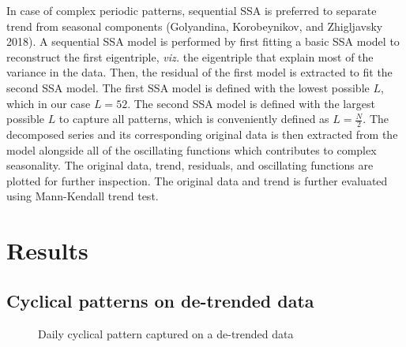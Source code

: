 \documentclass[
  letterpaper,
  DIV=11,
  numbers=noendperiod]{scrartcl}
\newcommand*\uselandscape{%
  \cleardoublepage
  \KOMAoptions{paper=landscape}%
  \recalctypearea
  \areaset{1.2\textwidth}{1.2\textheight}%
}
\begin{document}
In case of complex periodic patterns, sequential SSA is preferred to
separate trend from seasonal components (Golyandina, Korobeynikov, and
Zhigljavsky 2018). A sequential SSA model is performed by first fitting
a basic SSA model to reconstruct the first eigentriple, \emph{viz.} the
eigentriple that explain most of the variance in the data. Then, the
residual of the first model is extracted to fit the second SSA model.
The first SSA model is defined with the lowest possible \(L\), which in
our case \(L = 52\). The second SSA model is defined with the largest
possible \(L\) to capture all patterns, which is conveniently defined as
\(L = \frac{N}{2}\). The decomposed series and its corresponding
original data is then extracted from the model alongside all of the
oscillating functions which contributes to complex seasonality. The
original data, trend, residuals, and oscillating functions are plotted
for further inspection. The original data and trend is further evaluated
using Mann-Kendall trend test.

\uselandscape

\section{Results}\label{results}

\subsection{Cyclical patterns on de-trended
data}\label{cyclical-patterns-on-de-trended-data}

\begin{figure}


\caption{\label{fig-period-day}Daily cyclical pattern captured on a
de-trended data}

\end{figure}%
\end{document}

